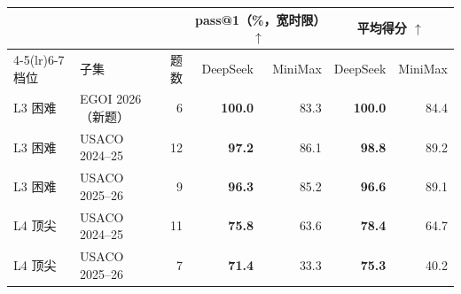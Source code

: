 \begin{tabular}{llrrrrr}
\toprule
 & & & \multicolumn{2}{c}{pass@1（\%，宽时限）$\uparrow$} & \multicolumn{2}{c}{平均得分 $\uparrow$} \\
\cmidrule(lr){4-5}\cmidrule(lr){6-7}
档位 & 子集 & 题数 & DeepSeek & MiniMax & DeepSeek & MiniMax \\
\midrule
L3 困难 & EGOI 2026（新题） & 6 & \textbf{100.0} & 83.3 & \textbf{100.0} & 84.4 \\
L3 困难 & USACO 2024--25 & 12 & \textbf{97.2} & 86.1 & \textbf{98.8} & 89.2 \\
L3 困难 & USACO 2025--26 & 9 & \textbf{96.3} & 85.2 & \textbf{96.6} & 89.1 \\
L4 顶尖 & USACO 2024--25 & 11 & \textbf{75.8} & 63.6 & \textbf{78.4} & 64.7 \\
L4 顶尖 & USACO 2025--26 & 7 & \textbf{71.4} & 33.3 & \textbf{75.3} & 40.2 \\
\bottomrule
\end{tabular}
